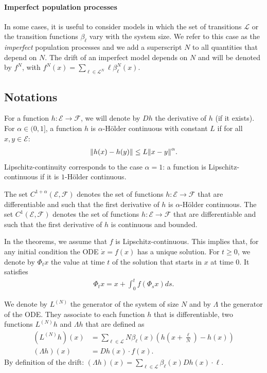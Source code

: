 \documentclass[sigconf]{acmart}
\newcommand\LN{L^{(N)}}
\newcommand\E{\mathcal{E}}
\newcommand\calL{\mathcal{L}}
\newcommand\calF{\mathcal{F}}
\newcommand\norm[1]{{\mathchoice{\bnorm{#1}}{\snorm{#1}}{\snorm{#1}}{\snorm{#1}}}}
\newcommand\bnorm[1]{\left\|#1\right\|}
\newcommand\snorm[1]{\|#1\|}
\begin{document}
\paragraph*{Imperfect population processes}

In some cases, it is useful to consider models in which the set of
transitions $\calL$ or the transition functions $\beta_\ell$ vary with
the system size. We refer to this case as the \emph{imperfect}
population processes and we add a superscript $N$ to all quantities
that depend on $N$. The drift of an imperfect model depends on $N$ and
will be denoted by $f^N$, with
$f^N(x) = \sum_{\ell\in\calL^N}\ell\beta^N_{\ell}(x)$. 



\subsection{Notations}


For a function $h:\E\to\calF$, we will denote by $Dh$ the derivative
of $h$ (if it exists). For $\alpha\in(0,1]$, a function $h$ is
$\alpha$-Hölder continuous with constant $L$ if for all $x,y\in\E$:
\begin{align*}
  \norm{h(x)-h(y)}\le L\norm{x-y}^\alpha. 
\end{align*} 
Lipschitz-continuity corresponds to the case $\alpha=1$: a function is
Lipschitz-continuous if it is $1$-Hölder continuous.

The set $C^{1+\alpha}(\E,\calF)$ denotes the set of functions
$h:\E\to\calF$ that are differentiable and such that the first
derivative of $h$ is $\alpha$-Hölder continuous.  The set
$C^1(\E,\calF)$ denotes the set of functions $h:\E\to\calF$ that are
differentiable and such that the first derivative of $h$ is
continuous and bounded.

In the theorems, we assume that $f$ is Lipschitz-continuous. This
implies that, for any initial condition the ODE $\dot{x}=f(x)$ has a
unique solution. For $t\ge0$, we denote by $\Phi_tx$ the value at time
$t$ of the solution that starts in $x$ at time $0$. It satisfies
\begin{align*}
  \Phi_tx = x + \int_0^t f(\Phi_sx)ds. 
\end{align*}

We denote by $\LN$ the generator of the system of size $N$ and by
$\Lambda$ the generator of the ODE. They associate to each function
$h$ that is differentiable, two functions $\LN h$ and $\Lambda h$ that
are defined as 
\begin{align*}
  (\LN h) (x) &= \sum_{\ell\in\calL} N\beta_\ell(x) ( h(x+\frac{\ell}{N})-h(x) )\\
  (\Lambda h) (x) &= D h(x) \cdot f(x).
\end{align*}
By definition of the drift:
$(\Lambda h)(x)=\sum_{\ell\in\calL} \beta_\ell(x) D h(x) \cdot \ell$.
\end{document}
